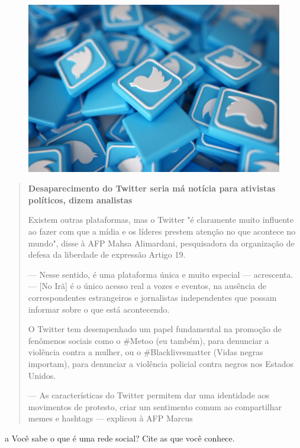 \begin{figure}[htpb!]
\includegraphics[width=.5\textwidth]{./imgs/img50.png}
\end{figure}

\begin{quote}
\textbf{Desaparecimento do Twitter seria má notícia para ativistas
políticos, dizem analistas }

Existem outras plataformas, mas o Twitter "é claramente muito influente
ao fazer com que a mídia e os líderes prestem atenção no que acontece no
mundo", disse à AFP Mahsa Alimardani, pesquisadora da organização de
defesa da liberdade de expressão Artigo 19.

--- Nesse sentido, é uma plataforma única e muito especial ---
acrescenta. --- {[}No Irã{]} é o único acesso real a vozes e eventos, na
ausência de correspondentes estrangeiros e jornalistas independentes que
possam informar sobre o que está acontecendo.

O Twitter tem desempenhado um papel fundamental na promoção de fenômenos
sociais como o \#Metoo (eu também), para denunciar a violência contra a
mulher, ou o \#Blacklivesmatter (Vidas negras importam), para denunciar
a violência policial contra negros nos Estados Unidos.

--- As características do Twitter permitem dar uma identidade aos
movimentos de protesto, criar um sentimento comum ao compartilhar memes
e hashtags --- explicou à AFP Marcus

\end{quote}

\num{a} Você sabe o que é uma rede social? Cite as que você conhece.


